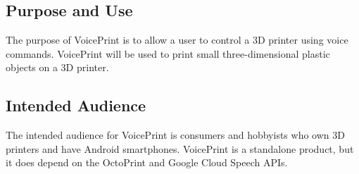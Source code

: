
\subsection{Purpose and Use}
The purpose of VoicePrint is to allow a user to control a 3D printer using voice commands. VoicePrint will be used to print small three-dimensional plastic objects on a 3D printer. 

\subsection{Intended Audience}
The intended audience for VoicePrint is consumers and hobbyists who own 3D printers and have Android smartphones. VoicePrint is a standalone product, but it does depend on the OctoPrint and Google Cloud Speech APIs.